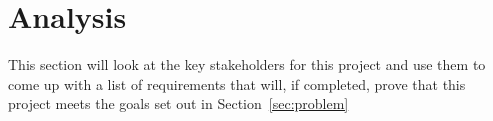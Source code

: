 
\section{Analysis}

This section will look at the key stakeholders for this project and use them to come up with a list of requirements that will, if completed, prove that this project meets the goals set out in Section~\ref{sec:problem}


